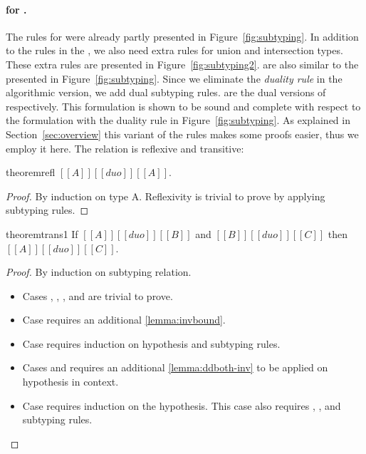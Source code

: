 \paragraph{\nameduo for \ui.}
The \nameduo rules for \ui were already partly presented in
Figure~\ref{fig:subtyping}. In addition to the rules in the 
\gstlc, we also need extra rules for union and intersection
types. These extra rules are presented in Figure~\ref{fig:subtyping2}.
 are also similar to the  presented in Figure~\ref{fig:subtyping}.
Since we eliminate the \emph{duality rule} in the algorithmic version, we add dual subtyping rules.
 are the dual versions of  respectively.
This formulation is shown to be sound and
complete with respect to the formulation with the duality rule in Figure~\ref{fig:subtyping}.
As explained in Section~\ref{sec:overview} this variant of the rules makes
some proofs easier, thus we employ it here. The \nameduo relation
is reflexive and transitive:

\begin{restatable}[Reflexivity]{theorem}{refl}
  $[[A]] [[duo]] [[A]]$.
\end{restatable}

\begin{proof}
By induction on type A. Reflexivity is trivial to prove by applying subtyping rules.
\end{proof}

\begin{restatable}[Transitivity]{theorem}{trans1}
  If $[[A]] [[duo]] [[B]]$ and $[[B]] [[duo]] [[C]]$ then $[[A]] [[duo]] [[C]]$.
\end{restatable}

\begin{proof}
By induction on subtyping relation. 
\begin{itemize}
	\item{Cases , , ,  and  are trivial to prove.}
	\item{Case   requires an additional \cref{lemma:invbound}.}
	\item{Case  requires induction on hypothesis and subtyping rules.}
	\item{Cases  and  requires an additional \cref{lemma:ddboth-inv} to be applied on hypothesis in context.}
	\item{Case  requires induction on the hypothesis. This case also requires , , and  subtyping rules.}
\end{itemize}
\end{proof}

